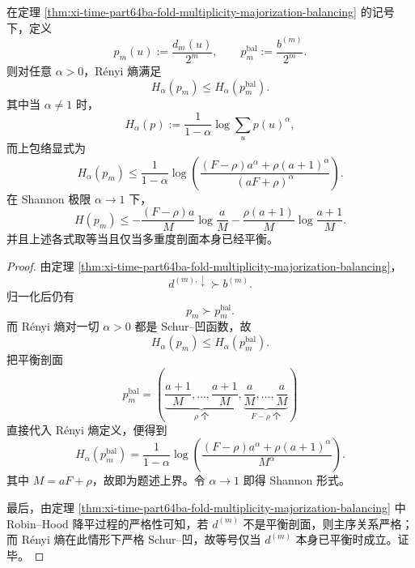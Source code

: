 \begin{corollary}\label{cor:xi-time-part64ba-balanced-profile-universal-renyi-envelope}
在定理 \ref{thm:xi-time-part64ba-fold-multiplicity-majorization-balancing} 的记号下，定义
\[
p_m(u):=\frac{d_m(u)}{2^m},
\qquad
p_m^{\mathrm{bal}}:=\frac{b^{(m)}}{2^m}.
\]
则对任意 \(\alpha>0\)，Rényi 熵满足
\[
\boxed{\;
H_\alpha(p_m)\le H_\alpha(p_m^{\mathrm{bal}}).\;}
\]
其中当 \(\alpha\neq 1\) 时，
\[
H_\alpha(p):=\frac{1}{1-\alpha}\log\sum_u p(u)^\alpha,
\]
而上包络显式为
\[
\boxed{\;
H_\alpha(p_m)
\le
\frac{1}{1-\alpha}
\log\!\left(
\frac{(F-\rho)a^\alpha+\rho(a+1)^\alpha}{(aF+\rho)^\alpha}
\right).\;}
\]
在 Shannon 极限 \(\alpha\to 1\) 下，
\[
\boxed{\;
H(p_m)\le
-\frac{(F-\rho)a}{M}\log\frac{a}{M}
-\frac{\rho(a+1)}{M}\log\frac{a+1}{M}.\;}
\]
并且上述各式取等当且仅当多重度剖面本身已经平衡。
\end{corollary}
\begin{proof}
由定理 \ref{thm:xi-time-part64ba-fold-multiplicity-majorization-balancing}，
\[
d^{(m),\downarrow}\succ b^{(m)}.
\]
归一化后仍有
\[
p_m\succ p_m^{\mathrm{bal}}.
\]
而 Rényi 熵对一切 \(\alpha>0\) 都是 Schur--凹函数，故
\[
H_\alpha(p_m)\le H_\alpha(p_m^{\mathrm{bal}}).
\]
把平衡剖面
\[
p_m^{\mathrm{bal}}=
\left(
\underbrace{\frac{a+1}{M},\dots,\frac{a+1}{M}}_{\rho\text{ 个}},
\underbrace{\frac{a}{M},\dots,\frac{a}{M}}_{F-\rho\text{ 个}}
\right)
\]
直接代入 Rényi 熵定义，便得到
\[
H_\alpha(p_m^{\mathrm{bal}})
=
\frac{1}{1-\alpha}
\log\!\left(
\frac{(F-\rho)a^\alpha+\rho(a+1)^\alpha}{M^\alpha}
\right).
\]
其中 \(M=aF+\rho\)，故即为题述上界。令 \(\alpha\to 1\) 即得 Shannon 形式。

最后，由定理 \ref{thm:xi-time-part64ba-fold-multiplicity-majorization-balancing} 中 Robin--Hood 降平过程的严格性可知，若 \(d^{(m)}\) 不是平衡剖面，则主序关系严格；而 Rényi 熵在此情形下严格 Schur--凹，故等号仅当 \(d^{(m)}\) 本身已平衡时成立。证毕。
\end{proof}

